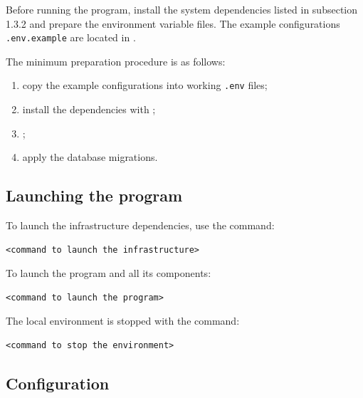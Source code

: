 \documentclass[12pt,a4paper]{extarticle}
\begin{document}
\begin{hseExample}
Before running the program, install the system dependencies listed in subsection 1.3.2 and prepare the environment variable files. The example configurations \texttt{.env.example} are located in .

The minimum preparation procedure is as follows:

\begin{enumerate}[label=\arabic*), leftmargin=1.25cm]
    \item copy the example configurations into working \texttt{.env} files;
    \item install the dependencies with ;
    \item {};
    \item apply the database migrations.
\end{enumerate}
\end{hseExample}

\subsection{Launching the program}

\begin{hseExample}
To launch the infrastructure dependencies, use the command:

\begin{verbatim}
<command to launch the infrastructure>
\end{verbatim}

To launch the program and all its components:

\begin{verbatim}
<command to launch the program>
\end{verbatim}

The local environment is stopped with the command:

\begin{verbatim}
<command to stop the environment>
\end{verbatim}
\end{hseExample}

\subsection{Configuration}
\end{document}
